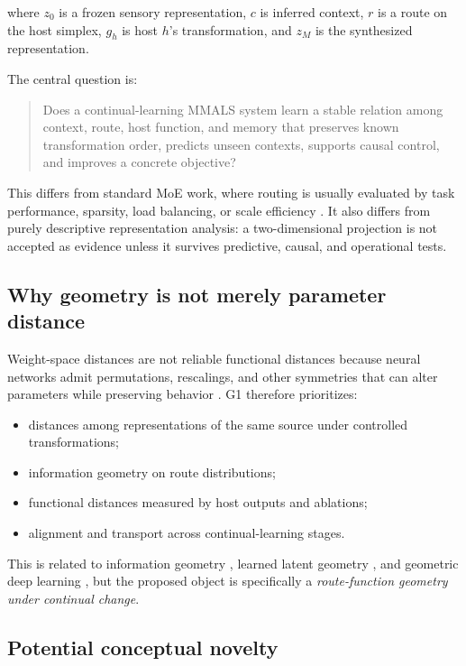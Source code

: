 \documentclass[11pt,a4paper]{article}
\begin{document}
where $z_0$ is a frozen sensory representation, $c$ is inferred context, $r$ is a route on the host simplex, $g_h$ is host $h$'s transformation, and $z_M$ is the synthesized representation.

The central question is:

\begin{quote}
Does a continual-learning MMALS system learn a stable relation among context, route, host function, and memory that preserves known transformation order, predicts unseen contexts, supports causal control, and improves a concrete objective?
\end{quote}

This differs from standard MoE work, where routing is usually evaluated by task performance, sparsity, load balancing, or scale efficiency \citep{shazeer2017moe,fedus2022switch}. It also differs from purely descriptive representation analysis: a two-dimensional projection is not accepted as evidence unless it survives predictive, causal, and operational tests.

\subsection{Why geometry is not merely parameter distance}

Weight-space distances are not reliable functional distances because neural networks admit permutations, rescalings, and other symmetries that can alter parameters while preserving behavior \citep{dinh2017sharp}. G1 therefore prioritizes:

\begin{itemize}
\item distances among representations of the same source under controlled transformations;
\item information geometry on route distributions;
\item functional distances measured by host outputs and ablations;
\item alignment and transport across continual-learning stages.
\end{itemize}

This is related to information geometry \citep{amari1998natural}, learned latent geometry \citep{arvanitidis2018latent,shao2018riemannian}, and geometric deep learning \citep{bronstein2021geometric}, but the proposed object is specifically a \emph{route-function geometry under continual change}.

\subsection{Potential conceptual novelty}
\end{document}
